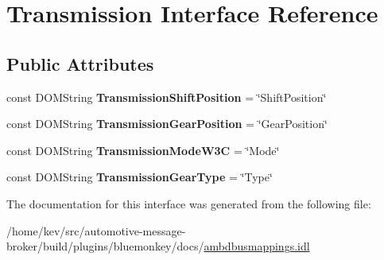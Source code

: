 \hypertarget{interfaceTransmission}{\section{Transmission Interface Reference}
\label{interfaceTransmission}
}
\subsection*{Public Attributes}
\begin{DoxyCompactItemize}
\item 
\hypertarget{interfaceTransmission_a749c8273349cd7689858ed24217049b1}{const D\+O\+M\+String {\bfseries Transmission\+Shift\+Position} = \char`\"{}Shift\+Position\char`\"{}}\label{interfaceTransmission_a749c8273349cd7689858ed24217049b1}

\item 
\hypertarget{interfaceTransmission_a0271138d40b3619ffcbfe32f2081d516}{const D\+O\+M\+String {\bfseries Transmission\+Gear\+Position} = \char`\"{}Gear\+Position\char`\"{}}\label{interfaceTransmission_a0271138d40b3619ffcbfe32f2081d516}

\item 
\hypertarget{interfaceTransmission_a5f02d4b865d13144dbbff4ca10e731b7}{const D\+O\+M\+String {\bfseries Transmission\+Mode\+W3\+C} = \char`\"{}Mode\char`\"{}}\label{interfaceTransmission_a5f02d4b865d13144dbbff4ca10e731b7}

\item 
\hypertarget{interfaceTransmission_afdd88c1d4eefa241b0ae1e444c8a7ed6}{const D\+O\+M\+String {\bfseries Transmission\+Gear\+Type} = \char`\"{}Type\char`\"{}}\label{interfaceTransmission_afdd88c1d4eefa241b0ae1e444c8a7ed6}

\end{DoxyCompactItemize}


The documentation for this interface was generated from the following file\+:\begin{DoxyCompactItemize}
\item 
/home/kev/src/automotive-\/message-\/broker/build/plugins/bluemonkey/docs/\hyperlink{ambdbusmappings_8idl}{ambdbusmappings.\+idl}\end{DoxyCompactItemize}
